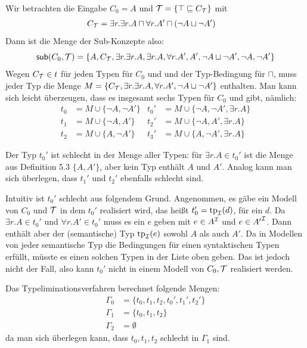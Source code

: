 \documentclass[fontsize=11pt, twoside=false, numbers=autoenddot]{scrbook}
\begin{document}
Wir betrachten die Eingabe $C_0=A$ und $\mathcal{T}=\{\top\sqsubseteq
C_\mathcal{T}\}$ mit
%
\begin{align*}
  C_\mathcal{T} & = \exists r.\exists r.A\sqcap \forall
    r.A'\sqcap (\neg A\sqcup \neg A')
\end{align*}
%
Dann ist die Menge der Sub-Konzepte also: 
%
\[\textsf{sub}(C_0,\mathcal{T}) = \{A,C_\mathcal{T},\exists r.\exists r.A,\exists r.A,
\forall r.A',A',\neg A\sqcup \neg A',\neg A,\neg A'\}\]
%
Wegen $C_\mathcal{T}\in t$ für jeden Typen für $C_0$ und \Tmc und der
Typ-Bedingung für $\sqcap$, muss jeder Typ die Menge
$M=\{C_\mathcal{T},\exists r.\exists r.A,\forall r.A',\neg A\sqcup \neg
A'\}$ enthalten. 
Man kann sich leicht überzeugen, dass es insgesamt sechs Typen  
für $C_0$ und \Tmc gibt, nämlich: 
%
\begin{align*}
  t_0 & = M\cup \{\neg A,\neg A'\} & t_0' & = M\cup\{ \neg A,\neg
  A',\exists r.A\} \\
  t_1 & = M\cup \{\neg A, A'\} & t_2' & = M\cup\{ \neg A, A',\exists r.A\} \\
  t_2 & = M\cup \{A,\neg A'\} & t_3' & = M\cup\{ A,\neg A',\exists r.A\}
\end{align*}

\bigskip
Der Typ $t_0'$ ist schlecht in der Menge aller Typen: für $\exists
r.A\in t_0'$ ist die Menge aus Definition 5.3 $\{A,A'\}$, aber kein Typ
enthält $A$ und $A'$. Analog kann man sich überlegen, dass $t_1'$ und
$t_2'$ ebenfalls schlecht sind. 

Intuitiv ist $t_0'$ schlecht aus folgendem Grund. Angenommen, es gäbe
ein Modell \Imc von $C_0$ und $\mathcal{T}$ in dem $t_0'$ realisiert wird,
das heißt $t_0'=\text{tp}_\mathcal{I}(d)$, für ein $d$. Da $\exists r.A\in
t_0'$ und $\forall r.A'\in t_0'$ muss es ein $e$ geben mit $e\in
A^\mathcal{I}$ und $e\in {A'}^\mathcal{I}$. Dann enthält aber der (semantische) Typ
$\text{tp}_\mathcal{I}(e)$ sowohl
$A$ als auch $A'$.  Da in Modellen von \Tmc jeder semantische Typ die Bedingungen für einen
syntaktischen Typen erfüllt, müsste es einen solchen Typen in der
Liste oben geben. Das ist jedoch nicht der Fall, also kann $t_0'$
nicht in einem Modell von $C_0,\mathcal{T}$ realisiert werden. 

\bigskip
Das Typeliminationsverfahren berechnet folgende Mengen: 
%
\begin{align*}
  \Gamma_0 & = \{t_0,t_1,t_2,t_0',t_1',t_2'\} \\
  \Gamma_1 & = \{t_0,t_1,t_2\} \\
  \Gamma_2 & = \emptyset
\end{align*}
%
da man sich überlegen kann, dass $t_0,t_1,t_2$ schlecht in $\Gamma_1$
sind. 
\end{document}
